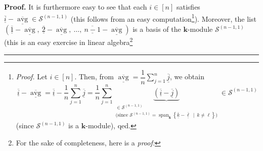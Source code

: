\documentclass[numbers=enddot,12pt,final,onecolumn,notitlepage]{scrartcl}%
\theoremstyle{definition}
\newenvironment{proof}[1][Proof]{\noindent\textbf{#1.} }{\ \rule{0.5em}{0.5em}}
\let\sumnonlimits\sum
\renewcommand{\sum}{\sumnonlimits\limits}
\begin{document}
\begin{proof}
It is furthermore easy to see that each $i\in\left[  n\right]  $ satisfies
$\underline{\overline{i}}-\underline{\overline{\operatorname*{avg}}}%
\in\mathcal{S}^{\left(  n-1,1\right)  }$ (this follows from an easy
computation\footnote{\textit{Proof.} Let $i\in\left[  n\right]  $. Then, from
$\underline{\overline{\operatorname*{avg}}}=\dfrac{1}{n}\sum_{j=1}%
^{n}\underline{\overline{j}}$, we obtain%
\[
\underline{\overline{i}}-\underline{\overline{\operatorname*{avg}}%
}=\underline{\overline{i}}-\dfrac{1}{n}\sum_{j=1}^{n}\underline{\overline{j}%
}=\dfrac{1}{n}\sum_{j=1}^{n}\underbrace{\left(  \underline{\overline{i}%
}-\underline{\overline{j}}\right)  }_{\substack{\in\mathcal{S}^{\left(
n-1,1\right)  }\\\text{(since }\mathcal{S}^{\left(  n-1,1\right)
}=\operatorname*{span}\nolimits_{\mathbf{k}}\left\{  \underline{\overline{k}%
}-\underline{\overline{\ell}}\ \mid\ k\neq\ell\right\}  \text{)}}%
}\in\mathcal{S}^{\left(  n-1,1\right)  }%
\]
(since $\mathcal{S}^{\left(  n-1,1\right)  }$ is a $\mathbf{k}$-module),
qed.}). Moreover, the list $\left(  \underline{\overline{1}}%
-\underline{\overline{\operatorname*{avg}}},\ \underline{\overline{2}%
}-\underline{\overline{\operatorname*{avg}}},\ \ldots,\ \underline{\overline
{n-1}}-\underline{\overline{\operatorname*{avg}}}\right)  $ is a basis of the
$\mathbf{k}$-module $\mathcal{S}^{\left(  n-1,1\right)  }$ (this is an easy
exercise in linear algebra\footnote{For the sake of completeness, here is a
\textit{proof:}
\par
{}}
\end{proof}
\end{document}

